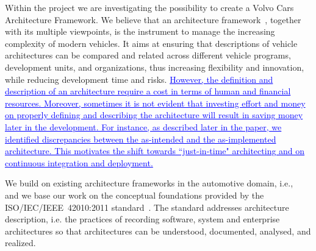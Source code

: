 \documentclass[preprint,12pt,3p]{elsarticle}
\newcommand{\ins}[1]{\textcolor{blue}{\uline{#1}}} %
\begin{document}
Within the project we are investigating the possibility to create a Volvo Cars Architecture Framework. %
We believe that an architecture framework~\cite{42010}, together with its multiple viewpoints, is the instrument to manage the increasing complexity of modern vehicles.
It aims at ensuring that descriptions of vehicle architectures can be compared and related across different vehicle programs,
development units, and organizations, thus increasing flexibility and innovation, while reducing development time and risks. \ins{However, the definition and description of an architecture require a cost in terms of human and financial resources. Moreover, sometimes it is not evident that investing effort and money on properly defining and describing the architecture will result in saving money later in the development. For instance, as described later in the paper, we identified discrepancies between the as-intended and the as-implemented architecture. This motivates the shift towards ``just-in-time" architecting and on continuous integration and deployment.} 

We build on existing architecture frameworks in the automotive domain, i.e.,~\cite{Broy,Yania} and we base our work on the conceptual foundations provided by the ISO/IEC/IEEE~42010:2011 standard~\cite{42010}.   
The standard 
 addresses architecture description, i.e. the practices of recording software, system
and enterprise architectures so that architectures can be understood,
documented, analysed, and realized. 
\end{document}
